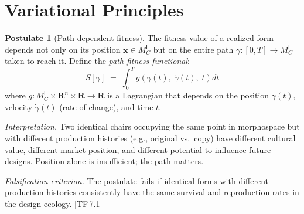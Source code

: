 \documentclass[10pt]{article}
\theoremstyle{definition}
\newtheorem{postulate}[definition]{Postulate}
\theoremstyle{plain}
\theoremstyle{remark}
\newcommand{\MC}{M^{\mathsf{I}}_C}          %
\providecommand{\Rn}{}
\renewcommand{\Rn}{\mathbf{R}^n}            %
\providecommand{\R}{}
\renewcommand{\R}{\mathbf{R}}               %
\newcommand{\TF}[1]{\textnormal{[TF\,#1]}}  %
\begin{document}
\newpage
\section{Variational Principles}\label{sec:variational}

\begin{postulate}[Path-dependent fitness]\label{post:8.1}
The fitness value of a realized form depends not only on its position
$\bm{x} \in \MC$ but on the entire path $\gamma : [0, T] \to \MC$
taken to reach it. Define the \emph{path fitness functional}:
\[
  S[\gamma] \;=\; \int_0^T
    g\!\left(\gamma(t),\; \dot{\gamma}(t),\; t\right) dt
\]
where $g : \MC \times \Rn \times \R \to \R$ is a Lagrangian that
depends on the position $\gamma(t)$, velocity $\dot{\gamma}(t)$
(rate of change), and time $t$.

\medskip\noindent
\textit{Interpretation.}\;
Two identical chairs occupying the same point in morphospace but with
different production histories (e.g., original vs.\ copy) have
different cultural value, different market position, and different
potential to influence future designs. Position alone is insufficient;
the path matters.

\medskip\noindent
\textit{Falsification criterion.}\;
The postulate fails if identical forms with different production
histories consistently have the same survival and reproduction rates
in the design ecology. \TF{7.1}
\end{postulate}
\end{document}

